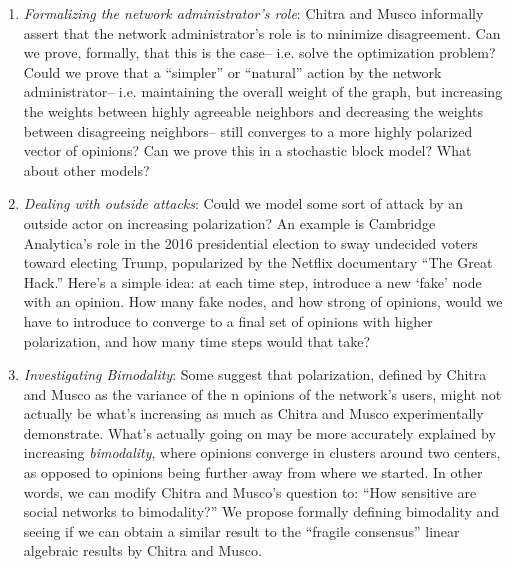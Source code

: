 \begin{enumerate}
    \item \emph{Formalizing the network administrator’s role}: Chitra and Musco informally assert that the network 
    administrator’s role is to minimize disagreement. Can we prove, formally, that this is the case-- i.e. 
    solve the optimization problem? Could we prove that a “simpler” or “natural” action by the network administrator-- i.e. maintaining the overall weight of the graph, but increasing the weights between highly agreeable neighbors and decreasing the weights between disagreeing neighbors-- still converges 
    to a more highly polarized vector of opinions? Can we prove this in a stochastic block model? What 
    about other models? 
    \item \emph{Dealing with outside attacks}:
    Could we model some sort of 
    attack by an outside actor on increasing polarization? 
    An example is Cambridge Analytica’s role in the 2016 
    presidential election to sway undecided voters toward 
    electing Trump, popularized by the Netflix documentary 
    “The Great Hack.” Here’s a simple idea: at each time step, 
    introduce a new ‘fake’ node with an opinion. How many fake nodes,
    and how strong of opinions, would we have to introduce to 
    converge to a final set of opinions with higher polarization,
    and how many time steps would that take?
    \item \emph{Investigating Bimodality}:
    Some suggest that polarization, 
    defined by Chitra and Musco as the variance of the n opinions 
    of the network’s users, might not actually be what’s increasing
    as much as Chitra and Musco experimentally demonstrate. 
    What’s actually going on may be more accurately explained by increasing \emph{bimodality}, where opinions converge in clusters around two centers, as opposed to opinions being further away from where we started.  In other words, we can modify Chitra and Musco’s question to: “How sensitive are social networks to bimodality?” 
    We propose formally defining bimodality and seeing 
    if we can obtain a similar result to the “fragile consensus”
    linear algebraic results by Chitra and Musco. 
\end{enumerate}
